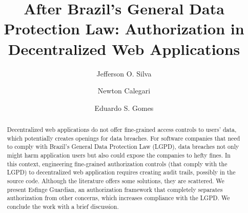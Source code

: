 \documentclass[sigconf]{acmart}
\begin{document}
%
\title[After Brazil's GDPR: Authorization in Decentralized Web Applications]{After Brazil's General Data Protection Law: Authorization in Decentralized Web Applications}

%
\author{Jefferson O. Silva}

\author{Newton Calegari}

\author{Eduardo S. Gomes}

%
\renewcommand{\shortauthors}{Silva et al.}

%
\begin{abstract}
Decentralized web applications do not offer fine-grained access controls to users' data, which potentially creates openings for data breaches. For software companies that need to comply with Brazil's  General Data Protection Law (LGPD), data breaches not only might harm application users but also could expose the companies to hefty fines. In this context, engineering fine-grained authorization controls (that comply with the LGPD) to decentralized web application requires creating audit trails, possibly in the source code. Although the literature offers some solutions, they are scattered. We present Esfinge Guardian, an authorization framework that completely separates authorization from other concerns, which increases compliance with the LGPD. We conclude the work with a brief discussion.
\end{abstract}
\end{document}
